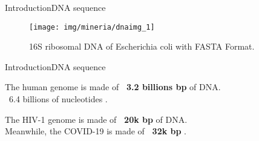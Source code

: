\documentclass[10pt]{beamer}
\newcommand{\1}{
	\setbeamertemplate{background}{
		\texttt{[image: img/1]}
		\tikz[overlay] \fill[fill opacity=0.75,fill=white] (0,0) rectangle (-\paperwidth,\paperheight);
	}
}
\begin{document}
\begin{frame}{Introduction}{DNA sequence}
	\begin{figure}[]
		\centering
		\texttt{[image: img/mineria/dnaimg\_1]}
		\label{img:mot2}
		\caption{16S ribosomal DNA of Escherichia coli with FASTA Format.}
	\end{figure}
\end{frame}

\begin{frame}{Introduction}{DNA sequence}%
	\begin{block}{}
		\centering
		The human genome is made of \textbf{\string ~3.2 billions bp} of DNA. \\
		\string ~6.4 billions of nucleotides \cite{archibald2018genomics}.
	\end{block}
	
	\begin{block}{}
		\centering
		The HIV-1 genome is made of \textbf{\string ~20k bp} of DNA. \\
		Meanwhile, the COVID-19 is made of \textbf{\string ~32k bp} \cite{randhawa2020machine}.
	\end{block}	
\end{frame}

\end{document}
